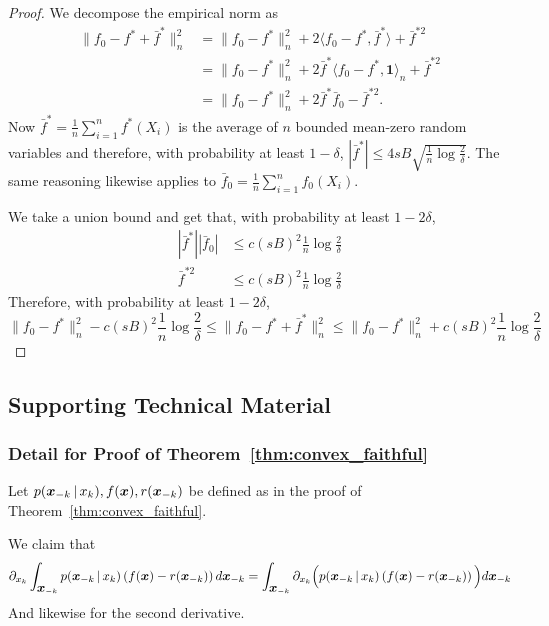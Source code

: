 \documentclass[12pt,pdftex,aos,noinfoline,addressasfootnote]{imsart}
\begin{document}
\begin{proof}
We decompose the empirical norm as
\begin{align*}
\| f_0 - f^* + \bar{f}^* \|_n^2 &= \| f_0 - f^* \|_n^2 
    + 2 \langle f_0 - f^*, \bar{f}^* \rangle + \bar{f}^{*2} \\
  &= \| f_0 - f^* \|_n^2 + 2 \bar{f}^* \langle f_0 - f^*, \mathbf{1} \rangle_n + 
    \bar{f}^{*2} \\
  &= \| f_0 - f^* \|_n^2 + 2 \bar{f}^* \bar{f}_0 - \bar{f}^{*2}.
\end{align*}
Now
$\bar{f}^* = \frac{1}{n} \sum_{i=1}^n f^*(X_i)$ is the average of $n$ bounded mean-zero random variables and therefore, with probability at least $1-\delta$, $| \bar{f}^* | \leq 4 sB \sqrt{ \frac{1}{n} \log \frac{2}{\delta} }$.
The same reasoning likewise applies to $\bar{f}_0 = \frac{1}{n} \sum_{i=1}^n f_0(X_i)$.

We take a union bound and get that, with probability at least $1- 2\delta$, 
\begin{align*}
| \bar{f}^* | | \bar{f}_0 | &\leq c (sB)^2 \frac{1}{n} \log \frac{2}{\delta} \\
\bar{f}^{*2} &\leq c (sB)^2 \frac{1}{n} \log \frac{2}{\delta}
\end{align*}
Therefore, with probability at least $1 - 2\delta$,
\[
\|f_0 - f^*\|_n^2 - c (sB)^2 \frac{1}{n} \log \frac{2}{\delta} \leq
    \| f_0 - f^* + \bar{f}^* \|_n^2 \leq 
\|f_0 - f^*\|_n^2 + c (sB)^2 \frac{1}{n} \log \frac{2}{\delta}
\]
\end{proof}





\subsection{Supporting Technical Material}

\subsubsection{Detail for Proof of Theorem~\ref{thm:convex_faithful}} 
\label{sec:dominated_condition}

Let $p(\mbox{\boldmath $x$}_{-k} {\,|\,} x_k), f(\mbox{\boldmath $x$}), r(\mbox{\boldmath $x$}_{-k})$ be defined as in the proof of Theorem~\ref{thm:convex_faithful}.

We claim that 
\[
\partial_{x_k} \int_{\mbox{\boldmath $x$}_{-k}} 
  p(\mbox{\boldmath $x$}_{-k} {\,|\,} x_k)\left( f(\mbox{\boldmath $x$}) - r(\mbox{\boldmath $x$}_{-k}) \right) d\mbox{\boldmath $x$}_{-k} 
 = \int_{\mbox{\boldmath $x$}_{-k}} \partial_{x_k} \Big( p(\mbox{\boldmath $x$}_{-k} {\,|\,} x_k)\left( f(\mbox{\boldmath $x$}) - r(\mbox{\boldmath $x$}_{-k}) \right) \Big) d \mbox{\boldmath $x$}_{-k}
\]
And likewise for the second derivative.\\
\end{document}
